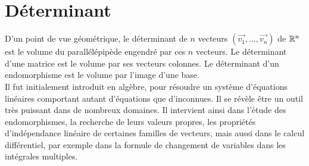 \documentclass{book}
\begin{document}
\chapter*{Déterminant}
\begin{Texte}%
D'un point de vue géométrique, le déterminant de $n$ vecteurs $(\vec{v_1},\ldots,\vec{v_n})$ de $\mathbb{R}^n$ est le volume du parallélépipède engendré par ces $n$ vecteurs. Le déterminant d'une matrice  est le volume par ses vecteurs colonnes. Le déterminant d'un endomorphisme est le volume par l'image d'une base.\\
Il fut initialement introduit en algèbre, pour résoudre un système d'équations linéaires comportant autant d'équations que d'inconnues. Il se révèle être un outil très puissant dans de nombreux domaines. Il intervient ainsi dans l'étude des endomorphismes, la recherche de leurs valeurs propres, les propriétés d'indépendance linéaire de certaines familles de vecteurs, mais aussi dans le calcul différentiel, par exemple dans la formule de changement de variables dans les intégrales multiples.
\end{Texte}
\end{document}
